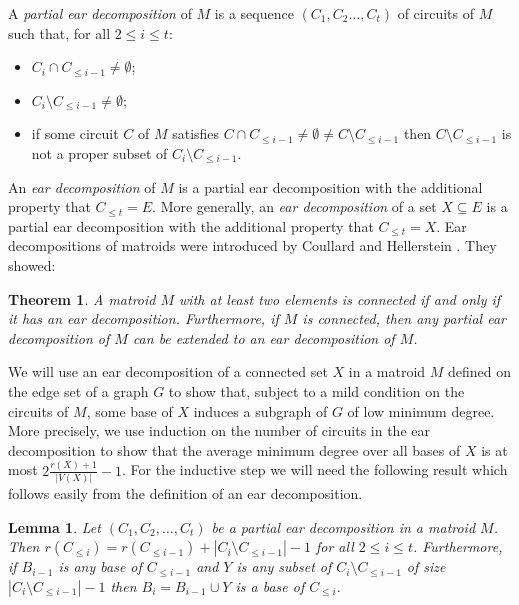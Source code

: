 \documentclass{daj}
\newtheorem{theorem}[thm]{Theorem}\theoremstyle{plain}
\newtheorem{lemma}[thm]{Lemma}\theoremstyle{plain}
\begin{document}
A {\em partial ear decomposition} of   ${M}$ is a sequence $(C_1, C_2\dots, C_t)$ of circuits of $M$ such that, for all $2\leq i\leq t$:
\begin{itemize}
\item $C_i\cap C_{\leq i-1}\neq \emptyset$;
\item $C_i\setminus C_{\leq i-1}\neq \emptyset$;
\item if some circuit $C$ of $M$ satisfies $C\cap C_{\leq i-1}\neq \emptyset\neq C\setminus C_{\leq i-1}$ then
$C\setminus C_{\leq i-1}$ is not a proper subset of  $C_i\setminus C_{\leq i-1}$.
\end{itemize}
An {\em ear decomposition} of  $M$ is a partial ear decomposition with the additional property  that $C_{\leq t}=E$. More generally,
an {\em ear decomposition} of a set $X\subseteq E$ is a partial ear decomposition with the additional property  that $C_{\leq t}=X$. Ear decompositions of matroids were introduced by Coullard and Hellerstein \cite{CH}. They showed:

\begin{theorem}\label{thm:ear}
A  matroid $M$ with at least two elements is connected if and only if it has an ear decomposition. Furthermore, if
$M$ is connected, then any partial ear decomposition of $M$ can be extended to an ear decomposition of $M$.
\end{theorem}

We will use an ear decomposition of a connected set $X$ in a matroid $M$ defined on the edge set of a graph $G$ to show that, subject to a mild condition on the circuits of $M$, some base of $X$ induces a subgraph of $G$ of low minimum degree.  More precisely, we use induction on the number of circuits in the ear decomposition
to show that the average minimum degree over all bases of $X$ is at most $2\frac{r(X)+1}{|V(X)|}-1$. For the inductive step we will need the following result which follows easily from the definition of an ear decomposition.  %

\begin{lemma}\label{lem:ear} Let $(C_1,C_2,\ldots,C_t)$ be a partial  ear decomposition in a  matroid $M
$. Then $r(C_{\leq i})=r(C_{\leq i-1})+|C_i\setminus C_{\leq i-1}|-1$ for all $2\leq i\leq t$.
Furthermore, if $B_{i-1}$ is any base of $C_{\leq i-1}$ and $Y$ is any subset of $C_i\setminus C_{\leq i-1}$ of size $|C_i\setminus C_{\leq i-1}|-1$ then $B_i=B_{i-1}\cup Y$ is a base of $C_{\leq i}$.
\end{lemma}
\end{document}
